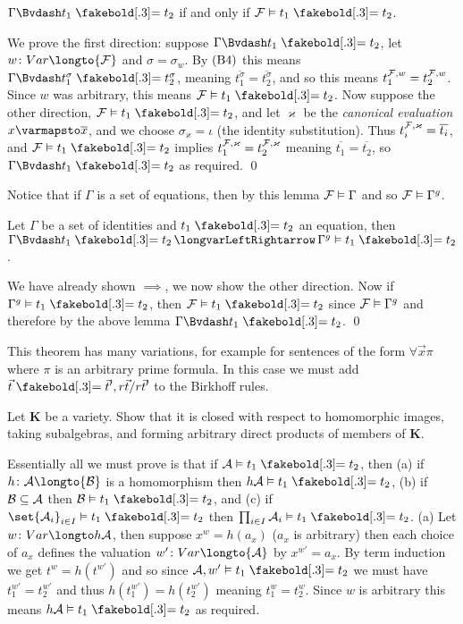 \blemm

    $\Gamma\Bvdash t_1\eq t_2$ if and only if ${\cal F}\vDash t_1\eq t_2$.

\elemm

We prove the first direction: suppose $\Gamma\Bvdash t_1\eq t_2$, let $w\colon\Var\longto{\cal F}$ and $\sigma=\sigma_w$.
By $\rm(B4)$ this means $\Gamma\Bvdash t_1^\sigma\eq t_2^\sigma$, meaning $\overline{t_1^\sigma}=\overline{t_2^\sigma}$, and so this means $t_1^{{\cal F},w}=t_2^{{\cal F},w}$.
Since $w$ was arbitrary, this means ${\cal F}\vDash t_1\eq t_2$.
Now suppose the other direction, ${\cal F}\vDash t_1\eq t_2$, and let $\varkappa$ be the {\it canonical evaluation} $x\varmapsto\overline x$, and we choose $\sigma_\varkappa=\iota$ (the identity
substitution).
Thus $t_i^{{\cal F},\varkappa}=\overline{t_i}$, and ${\cal F}\vDash t_1\eq t_2$ implies $t_1^{{\cal F},\varkappa}=t_2^{{\cal F},\varkappa}$ meaning $\overline{t_1}=\overline{t_2}$, so
$\Gamma\Bvdash t_1\eq t_2$ as required.
\qed

Notice that if $\Gamma$ is a set of equations, then by this lemma ${\cal F}\vDash\Gamma$ and so ${\cal F}\vDash\Gamma^g$.

\bthrm[title=Birkhoff's Completeness Theorem, name=birkhoffcompletenesstheorem]

    Let $\Gamma$ be a set of identities and $t_1\eq t_2$ an equation, then $\Gamma\Bvdash t_1\eq t_2\iff\Gamma^g\vDash t_1\eq t_2$.

\ethrm

We have already shown $\implies$, we now show the other direction.
Now if $\Gamma^g\vDash t_1\eq t_2$, then ${\cal F}\vDash t_1\eq t_2$ since ${\cal F}\vDash\Gamma^g$ and therefore by the above lemma $\Gamma\Bvdash t_1\eq t_2$.
\qed

This theorem has many variations, for example for sentences of the form $\forall\vec x\pi$ where $\pi$ is an arbitrary prime formula.
In this case we must add $\vec t\eq\vec t',r\vec t/r\vec t'$ to the Birkhoff rules.

\bexerc

    Let $\boldsymbol K$ be a variety.
    Show that it is closed with respect to homomorphic images, taking subalgebras, and forming arbitrary direct products of members of $\boldsymbol K$.

\eexerc

Essentially all we must prove is that if ${\cal A}\vDash t_1\eq t_2$, then (a) if $h\colon{\cal A}\longto{\cal B}$ is a homomorphism then $h{\cal A}\vDash t_1\eq t_2$, (b) if ${\cal B}\subseteq{\cal A}$ then
${\cal B}\vDash t_1\eq t_2$, and (c) if $\set{{\cal A}_i}_{i\in I}\vDash t_1\eq t_2$ then $\prod_{i\in I}{\cal A}_i\vDash t_1\eq t_2$.
(a) Let $w\colon\Var\longto h{\cal A}$, then suppose $x^w=h(a_x)$ ($a_x$ is arbitrary) then each choice of $a_x$ defines the valuation $w'\colon\Var\longto{\cal A}$ by $x^{w'}=a_x$.
By term induction we get $t^w=h(t^{w'})$ and so since ${\cal A},w'\vDash t_1\eq t_2$ we must have $t_1^{w'}=t_2^{w'}$ and thus $h(t_1^{w'})=h(t_2^{w'})$ meaning $t_1^w=t_2^w$.
Since $w$ is arbitrary this means $h{\cal A}\vDash t_1\eq t_2$ as required.

